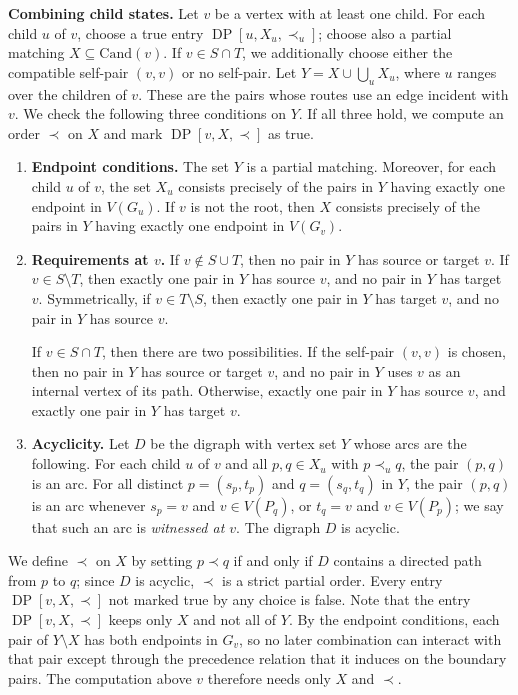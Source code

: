 \documentclass[a4paper,USenglish,thm-restate]{lipics-v2021}
\newcommand{\cand}{\mathrm{Cand}}
\theoremstyle{problemstyle}
\begin{document}
\smallskip
\noindent\textbf{Combining child states.}
Let $v$ be a vertex with at least one child. For each child $u$ of $v$,
choose a true entry $\operatorname{DP}[u,X_u,\prec_u]$; choose also a
partial matching $X\subseteq\cand(v)$. If $v\in S\cap T$, we additionally
choose either the compatible self-pair $(v,v)$ or no self-pair. Let
$Y=X\cup\bigcup_u X_u$, where $u$ ranges over the children of $v$. These
are the pairs whose routes use an edge incident with $v$. We check the
following three conditions on $Y$. If all three hold, we compute an order
$\prec$ on $X$ and mark $\operatorname{DP}[v,X,\prec]$ as true.
  
\begin{enumerate}
\item \textbf{Endpoint conditions.} The set $Y$ is a partial matching. Moreover, for each child $u$ of $v$, the set $X_u$ consists precisely of the pairs in $Y$ having exactly one endpoint in $V(G_u)$. If $v$ is not the root, then $X$ consists precisely of the pairs in $Y$ having exactly one endpoint in $V(G_v)$.
 
\item \textbf{Requirements at $v$.} If $v\notin S\cup T$, then no pair in $Y$ has source or target $v$. If $v\in S\setminus T$, then exactly one pair in $Y$ has source $v$, and no pair in $Y$ has target $v$. Symmetrically, if $v\in T\setminus S$, then exactly one pair in $Y$ has target $v$, and no pair in $Y$ has source $v$.
 
If $v\in S\cap T$, then there are two possibilities. If the self-pair $(v,v)$ is chosen, then no pair in $Y$ has source or target $v$, and no pair in $Y$ uses $v$ as an internal vertex of its path. Otherwise, exactly one pair in $Y$ has source $v$, and exactly one pair in $Y$ has target $v$.
 
\item \textbf{Acyclicity.} Let $D$ be the digraph with vertex set $Y$ whose
arcs are the following. For each child $u$ of $v$ and all $p,q\in X_u$
with $p\prec_u q$, the pair $(p,q)$ is an arc. For all distinct
$p=(s_p,t_p)$ and $q=(s_q,t_q)$ in $Y$, the pair $(p,q)$ is an arc whenever
$s_p=v$ and $v\in V(P_q)$, or $t_q=v$ and $v\in V(P_p)$; we say that such
an arc is \emph{witnessed at $v$}. The digraph $D$ is acyclic.
\end{enumerate}
 
We define $\prec$ on $X$ by setting $p\prec q$ if and only if $D$ contains
a directed path from $p$ to $q$; since $D$ is acyclic, $\prec$ is a strict
partial order. Every entry $\operatorname{DP}[v,X,\prec]$ not marked
true by any choice is false. Note that the entry
$\operatorname{DP}[v,X,\prec]$ keeps only $X$ and not all of $Y$. By the
endpoint conditions, each pair of $Y\setminus X$ has both endpoints in
$G_v$, so no later combination can interact with that pair except through
the precedence relation that it induces on the boundary pairs. The
computation above $v$ therefore needs only $X$ and $\prec$.
\end{document}
